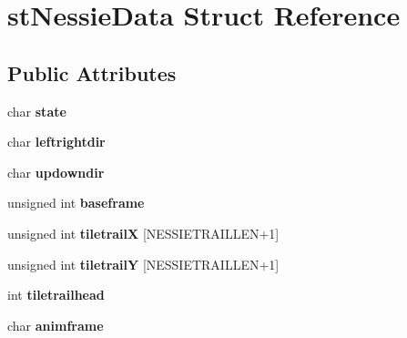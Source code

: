 \hypertarget{structst_nessie_data}{
\section{stNessieData Struct Reference}
\label{structst_nessie_data}
}
\subsection*{Public Attributes}
\begin{DoxyCompactItemize}
\item 
\hypertarget{structst_nessie_data_a0e50c4bf3c712091c9f25c62b209aa54}{
char {\bfseries state}}
\label{structst_nessie_data_a0e50c4bf3c712091c9f25c62b209aa54}

\item 
\hypertarget{structst_nessie_data_a5c5a7ef5ee7529285d8b0ad02a42334b}{
char {\bfseries leftrightdir}}
\label{structst_nessie_data_a5c5a7ef5ee7529285d8b0ad02a42334b}

\item 
\hypertarget{structst_nessie_data_ade1c2a82ddc3d1f96ec5844d07b5ab9f}{
char {\bfseries updowndir}}
\label{structst_nessie_data_ade1c2a82ddc3d1f96ec5844d07b5ab9f}

\item 
\hypertarget{structst_nessie_data_a7087283bd344a63832129bd83148268d}{
unsigned int {\bfseries baseframe}}
\label{structst_nessie_data_a7087283bd344a63832129bd83148268d}

\item 
\hypertarget{structst_nessie_data_a4bdccef64e23efe7e951dec7b8ef7647}{
unsigned int {\bfseries tiletrailX} \mbox{[}NESSIETRAILLEN+1\mbox{]}}
\label{structst_nessie_data_a4bdccef64e23efe7e951dec7b8ef7647}

\item 
\hypertarget{structst_nessie_data_a67211f4df37f47ecd0fcfb7c2183edef}{
unsigned int {\bfseries tiletrailY} \mbox{[}NESSIETRAILLEN+1\mbox{]}}
\label{structst_nessie_data_a67211f4df37f47ecd0fcfb7c2183edef}

\item 
\hypertarget{structst_nessie_data_a11870d1afa3261fffb3032878e0f580b}{
int {\bfseries tiletrailhead}}
\label{structst_nessie_data_a11870d1afa3261fffb3032878e0f580b}

\item 
\hypertarget{structst_nessie_data_afce88d96e5ff2cff4c48625ef277d5a1}{
char {\bfseries animframe}}
\label{structst_nessie_data_afce88d96e5ff2cff4c48625ef277d5a1}


\end{DoxyCompactItemize}

